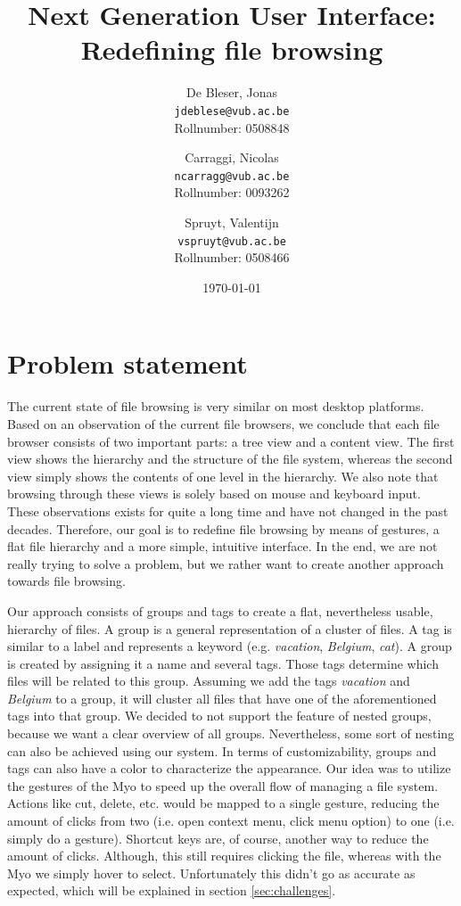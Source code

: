 \documentclass{article}
\title{Next Generation User Interface: \\Redefining file browsing}
\author{
  De Bleser, Jonas\\
  \texttt{jdeblese@vub.ac.be}\\
  Rollnumber: 0508848
  \and
  Carraggi, Nicolas\\
  \texttt{ncarragg@vub.ac.be}\\
  Rollnumber: 0093262
  \and
  Spruyt, Valentijn\\
  \texttt{vspruyt@vub.ac.be}\\
  Rollnumber: 0508466
}
\date{\today}
\begin{document}
\maketitle

\tableofcontents

\section{Problem statement}
The current state of file browsing is very similar on most desktop platforms. Based on an observation of the current file browsers, we conclude that each file browser consists of two important parts: a tree view and a content view. The first view shows the hierarchy and the structure of the file system, whereas the second view simply shows the contents of one level in the hierarchy.  We also note that browsing through these views is solely based on mouse and keyboard input. These observations exists for quite a long time and have not changed in the past decades. Therefore, our goal is to redefine file browsing by means of gestures, a flat file hierarchy and a more simple, intuitive interface. In the end, we are not really trying to solve a problem, but we rather want to create another approach towards file browsing.

Our approach consists of groups and tags to create a flat, nevertheless usable, hierarchy of files. A group is a general representation of a cluster of files. A tag is similar to a label and represents a keyword (e.g. \textit{vacation}, \textit{Belgium}, \textit{cat}). A group is created by assigning it a name and several tags. Those tags determine which files will be related to this group. Assuming we add the tags \textit{vacation} and \textit{Belgium} to a group, it will cluster all files that have one of the aforementioned tags into that group. We decided to not support the feature of nested groups, because we want a clear overview of all groups. Nevertheless, some sort of nesting can also be achieved using our system. In terms of customizability, groups and tags can also have a color to characterize the appearance. Our idea was to utilize the gestures of the Myo to speed up the overall flow of managing a file system. Actions like cut, delete, etc. would be mapped to a single gesture, reducing the amount of clicks from two (i.e. open context menu, click menu option) to one (i.e. simply do a gesture). Shortcut keys are, of course, another way to reduce the amount of clicks. Although, this still requires clicking the file, whereas with the Myo we simply hover to select. Unfortunately this didn't go as accurate as expected, which will be explained in section \ref{sec:challenges}.
\end{document}

